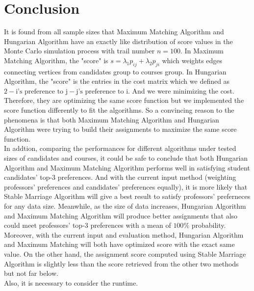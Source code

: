 \documentclass[twoside,twocolumn]{article}
\begin{document}
    \section{Conclusion}
    It is found from all sample sizes that Maximum Matching Algorithm and Hungarian Algorithm have an exactly like
    distribution of score values in the Monte Carlo simulation process with trail number $n=100$. In Maximum Matching 
    Algorithm, the "score" is $s = \lambda_1 p_{ij} + \lambda_2 p_{ji}$ which weights 
    edges connecting vertices from candidates group to courses group. In Hungarian Algorithm, the "score" is the entries
    in the cost matrix which we defined as $2 - \text{i's preference to j} - \text{j's preference to i}$. And we were 
    minimizing the cost. Therefore, they are optimizing the same score function but we implemented the score function 
    differently to fit the algorithms. So a convincing reason to the phenomena is that both Maximum Matching Algorithm and 
    Hungarian Algorithm were trying to build their assignments to maximize the same score function. 
    \\\indent In addtion, comparing the performances for different algorithms under tested sizes of candidates and courses, it could be
    safe to conclude that both Hungarian Algorithm and Maximum Matching Algorithm performs well in satisfying student candidates'
    top-3 preferences. And with the current input method (weighting professors' preferences and candidates' preferences equally), it is
    more likely that Stable Marriage Algorithm will give a best result to satisfy professors' preferneces for any data size. Meanwhile, 
    as the size of data increases, Hungarian Algorithm and Maximum Matching Algorithm will produce better assignments that also could 
    meet professors' top-3 preferences with a mean of $100\%$ probability.
    \\\indent Moreover, with the current input and evaluation method, Hungarian Algorithm and Maximum Matching will both have optimized score
    with the exact same value. On the other hand, the assignment score computed using Stable Marriage Algorithm is slightly less than the score
    retrieved from the other two methods but not far below.
    \\\indent Also, it is necessary to consider the runtime.
\end{document}
